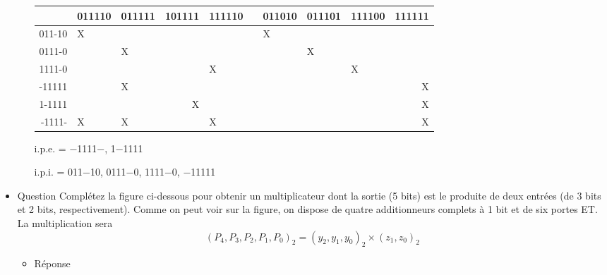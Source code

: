 \documentclass[letter, oneside]{book}
\begin{document}
\begin{itemize}
\begin{itemize}
\begin{center}
\begin{tabular}{rllrlllllr}
 & 011110 & 011111 & 101111 & 111110 &  & 011010 & 011101 & 111100 & 111111\\[0pt]
\hline
011-10 & X &  &  &  &  & X &  &  & \\[0pt]
0111-0 &  & X &  &  &  &  & X &  & \\[0pt]
1111-0 &  &  &  & X &  &  &  & X & \\[0pt]
-11111 &  & X &  &  &  &  &  &  & X\\[0pt]
1-1111 &  &  & X &  &  &  &  &  & X\\[0pt]
-1111- & X & X &  & X &  &  &  &  & X\\[0pt]
\end{tabular}
\end{center}

i.p.e. = −1111−, 1−1111

i.p.i. = 011−10, 0111−0, 1111−0, −11111
\end{itemize}

\item Question
\label{sec:org7ff68f0}
Complétez la figure ci-dessous pour obtenir un multiplicateur dont
la sortie (5 bits) est le produite de deux entrées (de 3 bits et 2
bits, respectivement). Comme on peut voir sur la figure, on dispose
de quatre additionneurs complets à 1 bit et de six portes ET. La
multiplication sera $$(P_4, P_3, P_2, P_1, P_0)_2 = (y_2, y_1, y_0)_2
\times (z_1, z_0)_2$$

\begin{center}

\end{center}

\begin{itemize}
\item Réponse
\label{sec:orgbcd08da}
\begin{center}

\end{center}
\end{itemize}


\end{itemize}
\end{document}
